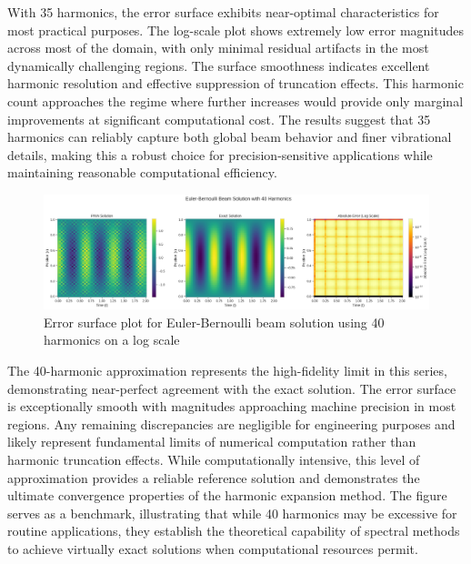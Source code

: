 \documentclass[preprint,12pt]{elsarticle}
\begin{document}
With 35 harmonics, the error surface exhibits near-optimal characteristics for most practical purposes. The log-scale plot shows extremely low error magnitudes across most of the domain, with only minimal residual artifacts in the most dynamically challenging regions. The surface smoothness indicates excellent harmonic resolution and effective suppression of truncation effects. This harmonic count approaches the regime where further increases would provide only marginal improvements at significant computational cost. The results suggest that 35 harmonics can reliably capture both global beam behavior and finer vibrational details, making this a robust choice for precision-sensitive applications while maintaining reasonable computational efficiency.

\begin{figure}[t]
    \centering
    \includegraphics[width=0.9\linewidth]{figures/comparison_40h.png}
    \caption{Error surface plot for Euler-Bernoulli beam solution using 40 harmonics on a log scale}
    \label{fig:error_40h}
\end{figure}

The 40-harmonic approximation represents the high-fidelity limit in this series, demonstrating near-perfect agreement with the exact solution. The error surface is exceptionally smooth with magnitudes approaching machine precision in most regions. Any remaining discrepancies are negligible for engineering purposes and likely represent fundamental limits of numerical computation rather than harmonic truncation effects. While computationally intensive, this level of approximation provides a reliable reference solution and demonstrates the ultimate convergence properties of the harmonic expansion method. The figure serves as a benchmark, illustrating that while 40 harmonics may be excessive for routine applications, they establish the theoretical capability of spectral methods to achieve virtually exact solutions when computational resources permit.
\end{document}

